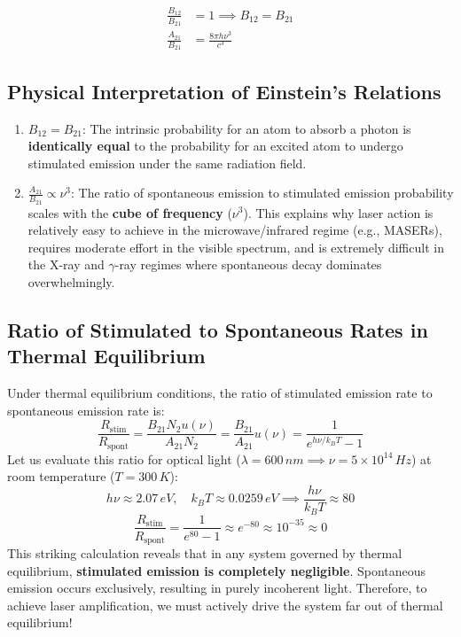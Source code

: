 \begin{keyequation}
\begin{align}
    \frac{B_{12}}{B_{21}} &= 1 \implies B_{12} = B_{21} \\
    \frac{A_{21}}{B_{21}} &= \frac{8\pi h \nu^3}{c^3}
\end{align}
\end{keyequation}

\subsection{Physical Interpretation of Einstein's Relations}
\begin{enumerate}
    \item $B_{12} = B_{21}$: The intrinsic probability for an atom to absorb a photon is \textbf{identically equal} to the probability for an excited atom to undergo stimulated emission under the same radiation field.
    \item $\frac{A_{21}}{B_{21}} \propto \nu^3$: The ratio of spontaneous emission to stimulated emission probability scales with the \textbf{cube of frequency} ($\nu^3$). This explains why laser action is relatively easy to achieve in the microwave/infrared regime (e.g., MASERs), requires moderate effort in the visible spectrum, and is extremely difficult in the X-ray and $\gamma$-ray regimes where spontaneous decay dominates overwhelmingly.
\end{enumerate}

\subsection{Ratio of Stimulated to Spontaneous Rates in Thermal Equilibrium}
Under thermal equilibrium conditions, the ratio of stimulated emission rate to spontaneous emission rate is:
\begin{equation}
    \frac{R_{\text{stim}}}{R_{\text{spont}}} = \frac{B_{21} N_2 u(\nu)}{A_{21} N_2} = \frac{B_{21}}{A_{21}} u(\nu) = \frac{1}{e^{h\nu / k_B T} - 1}
\end{equation}
Let us evaluate this ratio for optical light ($\lambda = 600\,\si{nm} \implies \nu = 5 \times 10^{14}\,\si{Hz}$) at room temperature ($T = 300\,\si{K}$):
\begin{equation}
    h\nu \approx 2.07\,\si{eV}, \quad k_B T \approx 0.0259\,\si{eV} \implies \frac{h\nu}{k_B T} \approx 80
\end{equation}
\begin{equation}
    \frac{R_{\text{stim}}}{R_{\text{spont}}} = \frac{1}{e^{80} - 1} \approx e^{-80} \approx 10^{-35} \approx 0
\end{equation}
This striking calculation reveals that in any system governed by thermal equilibrium, \textbf{stimulated emission is completely negligible}. Spontaneous emission occurs exclusively, resulting in purely incoherent light. Therefore, to achieve laser amplification, we must actively drive the system far out of thermal equilibrium!

